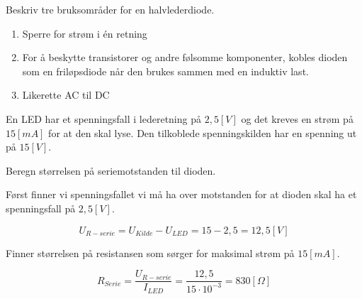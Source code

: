 \vspace{0.5cm} %

\begin{question}[name=Oppgave, topic=dioder]
	Beskriv tre bruksområder for en halvlederdiode.
\end{question}

\vspace{0.5cm} %

\begin{solution}[name=Løsningsforslag oppgave]
	\begin{enumerate}[label=\roman*)]
		\item Sperre for strøm i én retning
		\item For å beskytte transistorer og andre følsomme komponenter, kobles dioden som en friløpsdiode når den brukes sammen med en induktiv last.
		\item Likerette AC til DC
	\end{enumerate}
\end{solution}

\vspace{0.5cm} %





\begin{question}[name=Oppgave, topic=LEDdioder]
	En LED har et spenningsfall i lederetning på $2,5 [V]$ og det kreves en strøm på $15 [mA]$ for at den skal lyse. Den tilkoblede spenningskilden har en spenning ut på $15 [V]$.

	Beregn størrelsen på seriemotstanden til dioden.
\end{question}

\vspace{0.5cm} %

\begin{solution}[name=Løsningsforslag oppgave]
Først finner vi spenningsfallet vi må ha over motstanden for at dioden skal ha et spenningsfall på $2,5 [V]$.


\[U_{R-serie}=U_{Kilde}-U_{LED}=15-2,5=12,5 [V]\]

Finner størrelsen på resistansen som sørger for maksimal strøm på $15 [mA]$.

\[R_{Serie}=\frac{U_{R-serie}}{I_{LED}}=\frac{12,5}{15\cdot10^{-3}}=830 [\Omega]\]

\end{solution}


